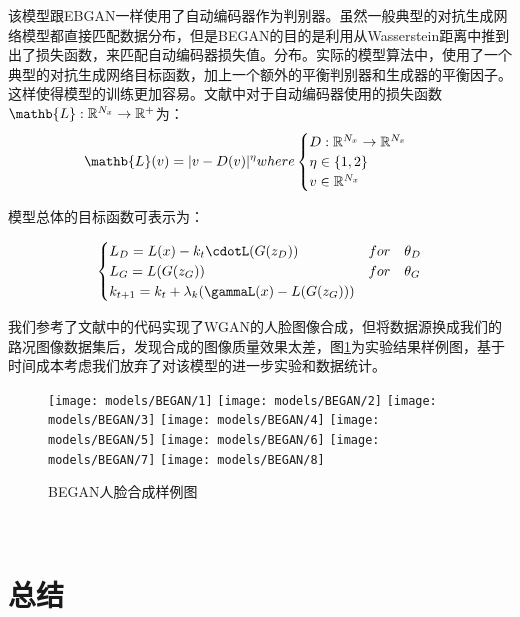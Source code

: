  该模型跟EBGAN\cite{ebgan}一样使用了自动编码器作为判别器。虽然一般典型的对抗生成网络模型都直接匹配数据分布，但是BEGAN的目的是利用从Wasserstein距离中推到出了损失函数，来匹配自动编码器损失值。分布。实际的模型算法中，使用了一个典型的对抗生成网络目标函数，加上一个额外的平衡判别器和生成器的平衡因子。这样使得模型的训练更加容易。文献\cite{BEGAN}中对于自动编码器使用的损失函数$\mathb{L}:\mathbb{R}^{N_x}\to \mathbb{R}^+$为：
\begin{align}
    \mathb{L}(v) = |v-D(v)|^\eta where \begin{cases}
        D: \mathbb{R}^{N_x}\to \mathbb{R}^{N_x} \quad  \\
        \eta \in \{1,2\} \quad  \\
        v \in \mathbb{R}^{N_x} 
    \end{cases}
\end{align}

模型总体的目标函数可表示为：

\begin{align}
    \begin{cases}
        L_D = L(x) - k_t\cdotL(G(z_D)) & for \quad \theta_D \\
        L_G = L(G(z_G)) & for \quad \theta_G \\
        k_{t+1} = k_t + \lambda_k(\gammaL(x)-L(G(z_G))) 
    \end{cases}  
\end{align}

我们参考了文献中的代码\cite{BEGAN}实现了WGAN的人脸图像合成，但将数据源换成我们的路况图像数据集后，发现合成的图像质量效果太差，图\ref{fig:began}为实验结果样例图，基于时间成本考虑我们放弃了对该模型的进一步实验和数据统计。

\begin{figure}[h]
    \centering
    \texttt{[image: models/BEGAN/1]}
    \texttt{[image: models/BEGAN/2]}
    \texttt{[image: models/BEGAN/3]}
    \texttt{[image: models/BEGAN/4]}
    \texttt{[image: models/BEGAN/5]}
    \texttt{[image: models/BEGAN/6]}
    \texttt{[image: models/BEGAN/7]}
    \texttt{[image: models/BEGAN/8]}
    \caption{BEGAN人脸合成样例图}
    \label{fig:began}
\end{figure}　

\section{总结}

